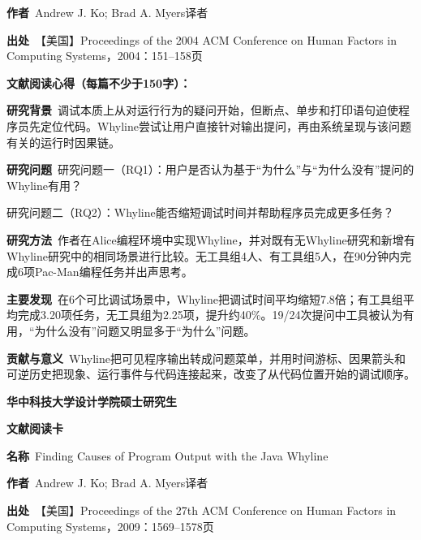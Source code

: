 \noindent\textbf{作者}\ Andrew J. Ko; Brad A. Myers\quad 译者\par
\noindent\textbf{出处}\ 【美国】Proceedings of the 2004 ACM Conference on Human Factors in Computing Systems，2004：151–158\quad 页\par
\vspace{0.35em}
\noindent\textbf{文献阅读心得（每篇不少于150字）：}\par
\noindent\textbf{研究背景}\ 调试本质上从对运行行为的疑问开始，但断点、单步和打印语句迫使程序员先定位代码。Whyline尝试让用户直接针对输出提问，再由系统呈现与该问题有关的运行时因果链。\par
\noindent\textbf{研究问题}\ 研究问题一（RQ1）：用户是否认为基于“为什么”与“为什么没有”提问的Whyline有用？\par
研究问题二（RQ2）：Whyline能否缩短调试时间并帮助程序员完成更多任务？\par
\noindent\textbf{研究方法}\ 作者在Alice编程环境中实现Whyline，并对既有无Whyline研究和新增有Whyline研究中的相同场景进行比较。无工具组4人、有工具组5人，在90分钟内完成6项Pac-Man编程任务并出声思考。\par
\noindent\textbf{主要发现}\ 在6个可比调试场景中，Whyline把调试时间平均缩短7.8倍；有工具组平均完成3.20项任务，无工具组为2.25项，提升约40\%。19/24次提问中工具被认为有用，“为什么没有”问题又明显多于“为什么”问题。\par
\noindent\textbf{贡献与意义}\ Whyline把可见程序输出转成问题菜单，并用时间游标、因果箭头和可逆历史把现象、运行事件与代码连接起来，改变了从代码位置开始的调试顺序。\par
\clearpage
\begin{center}
{\songti\bfseries\fontsize{18.5pt}{27.75pt}\selectfont 华中科技大学设计学院硕士研究生\par}
{\songti\bfseries\fontsize{18.5pt}{27.75pt}\selectfont 文献阅读卡\par}
\end{center}
\vspace{0.25em}
\noindent\underline{}\par
\vspace{0.35em}
\noindent\textbf{名称}\ Finding Causes of Program Output with the Java Whyline\par
\noindent\textbf{作者}\ Andrew J. Ko; Brad A. Myers\quad 译者\par
\noindent\textbf{出处}\ 【美国】Proceedings of the 27th ACM Conference on Human Factors in Computing Systems，2009：1569–1578\quad 页\par
